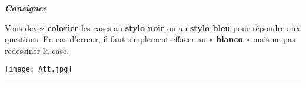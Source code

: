 \documentclass[a4paper,landscape,10pt]{article}
\begin{document}
{\begin{multicols}{3}
{\begin{center}
\begin{minipage}[b]{11cm}
{{\begin{minipage}{.9\linewidth}
\vspace*{.5cm}\dotfill

\vspace*{.5cm}\dotfill

\vspace*{.2cm}\dotfill
{}
\dotfill

\end{minipage}
}}\hfill\vspace{-1ex}\end{minipage}\hspace*{\fill}
\end{center}
}


\end{multicols}

\begin{center}\em
\begin{center} \large \bf \emph{Consignes} \end{center}
\begin{center}
Vous devez   \textbf{ \underline{colorier}} les cases au \textbf{\underline{stylo noir}} ou au \textbf{\underline{stylo bleu}} pour répondre aux questions.
En cas d'erreur, il faut simplement effacer au « \textbf{blanco} » mais ne pas redessiner la case.
\end{center}
\end{center}

\begin{center}
\begin{minipage}[c]{.2\linewidth}
\texttt{[image: Att.jpg]}
\end{minipage}
\end{center}

\hrule\vspace{0.2ex}

\begin{multicols}{3}
\columnseprule=1.0pt






\end{multicols}

}
\end{document}
